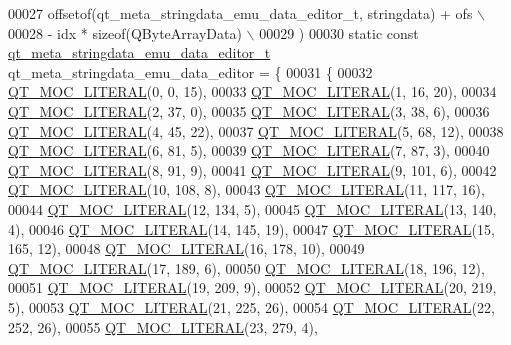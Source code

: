 \begin{DoxyCode}
00027 \textcolor{preprocessor}{    offsetof(qt\_meta\_stringdata\_emu\_data\_editor\_t, stringdata) + ofs \(\backslash\)}
00028 \textcolor{preprocessor}{        - idx * sizeof(QByteArrayData) \(\backslash\)}
00029 \textcolor{preprocessor}{    )}
00030 \textcolor{keyword}{static} \textcolor{keyword}{const} \hyperlink{a00014_d9/d77/a00095}{qt\_meta\_stringdata\_emu\_data\_editor\_t} 
      qt\_meta\_stringdata\_emu\_data\_editor = \{
00031     \{
00032 \hyperlink{a00014_a75bb9482d242cde0a06c9dbdc6b83abe}{QT\_MOC\_LITERAL}(0, 0, 15),
00033 \hyperlink{a00014_a75bb9482d242cde0a06c9dbdc6b83abe}{QT\_MOC\_LITERAL}(1, 16, 20),
00034 \hyperlink{a00014_a75bb9482d242cde0a06c9dbdc6b83abe}{QT\_MOC\_LITERAL}(2, 37, 0),
00035 \hyperlink{a00014_a75bb9482d242cde0a06c9dbdc6b83abe}{QT\_MOC\_LITERAL}(3, 38, 6),
00036 \hyperlink{a00014_a75bb9482d242cde0a06c9dbdc6b83abe}{QT\_MOC\_LITERAL}(4, 45, 22),
00037 \hyperlink{a00014_a75bb9482d242cde0a06c9dbdc6b83abe}{QT\_MOC\_LITERAL}(5, 68, 12),
00038 \hyperlink{a00014_a75bb9482d242cde0a06c9dbdc6b83abe}{QT\_MOC\_LITERAL}(6, 81, 5),
00039 \hyperlink{a00014_a75bb9482d242cde0a06c9dbdc6b83abe}{QT\_MOC\_LITERAL}(7, 87, 3),
00040 \hyperlink{a00014_a75bb9482d242cde0a06c9dbdc6b83abe}{QT\_MOC\_LITERAL}(8, 91, 9),
00041 \hyperlink{a00014_a75bb9482d242cde0a06c9dbdc6b83abe}{QT\_MOC\_LITERAL}(9, 101, 6),
00042 \hyperlink{a00014_a75bb9482d242cde0a06c9dbdc6b83abe}{QT\_MOC\_LITERAL}(10, 108, 8),
00043 \hyperlink{a00014_a75bb9482d242cde0a06c9dbdc6b83abe}{QT\_MOC\_LITERAL}(11, 117, 16),
00044 \hyperlink{a00014_a75bb9482d242cde0a06c9dbdc6b83abe}{QT\_MOC\_LITERAL}(12, 134, 5),
00045 \hyperlink{a00014_a75bb9482d242cde0a06c9dbdc6b83abe}{QT\_MOC\_LITERAL}(13, 140, 4),
00046 \hyperlink{a00014_a75bb9482d242cde0a06c9dbdc6b83abe}{QT\_MOC\_LITERAL}(14, 145, 19),
00047 \hyperlink{a00014_a75bb9482d242cde0a06c9dbdc6b83abe}{QT\_MOC\_LITERAL}(15, 165, 12),
00048 \hyperlink{a00014_a75bb9482d242cde0a06c9dbdc6b83abe}{QT\_MOC\_LITERAL}(16, 178, 10),
00049 \hyperlink{a00014_a75bb9482d242cde0a06c9dbdc6b83abe}{QT\_MOC\_LITERAL}(17, 189, 6),
00050 \hyperlink{a00014_a75bb9482d242cde0a06c9dbdc6b83abe}{QT\_MOC\_LITERAL}(18, 196, 12),
00051 \hyperlink{a00014_a75bb9482d242cde0a06c9dbdc6b83abe}{QT\_MOC\_LITERAL}(19, 209, 9),
00052 \hyperlink{a00014_a75bb9482d242cde0a06c9dbdc6b83abe}{QT\_MOC\_LITERAL}(20, 219, 5),
00053 \hyperlink{a00014_a75bb9482d242cde0a06c9dbdc6b83abe}{QT\_MOC\_LITERAL}(21, 225, 26),
00054 \hyperlink{a00014_a75bb9482d242cde0a06c9dbdc6b83abe}{QT\_MOC\_LITERAL}(22, 252, 26),
00055 \hyperlink{a00014_a75bb9482d242cde0a06c9dbdc6b83abe}{QT\_MOC\_LITERAL}(23, 279, 4),

\end{DoxyCode}
